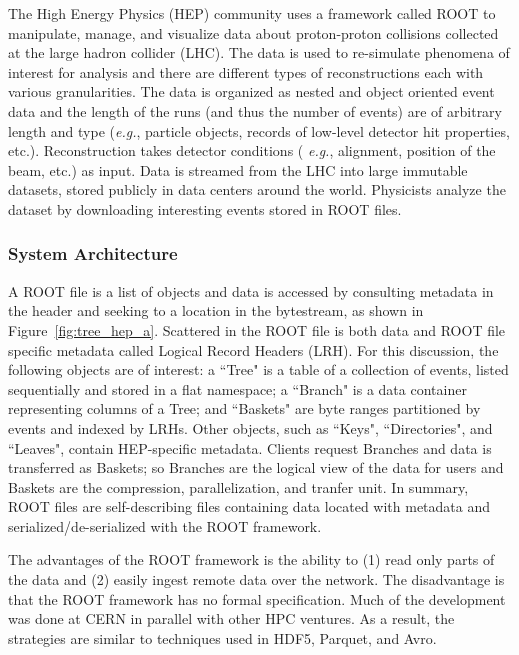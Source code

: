 The High Energy Physics (HEP) community uses a framework called ROOT to
manipulate, manage, and visualize data about proton-proton collisions collected
at the large hadron collider (LHC). The data is used to re-simulate phenomena
of interest for analysis and there are different types of reconstructions each
with various granularities. The data is organized as nested and object oriented
event data and the length of the runs (and thus the number of events) are of
arbitrary length and type ({\it e.g.}, particle objects, records of low-level
detector hit properties, etc.).  Reconstruction takes detector conditions ({\it
e.g.}, alignment, position of the beam, etc.) as input.  Data is streamed from
the LHC into large immutable datasets, stored publicly in data centers around
the world.  Physicists analyze the dataset by downloading interesting events
stored in ROOT files.

\subsubsection{System Architecture}

A ROOT file is a list of objects and data is accessed by consulting metadata in
the header and seeking to a location in the bytestream, as shown in
Figure~\ref{fig:tree_hep_a}. Scattered in the ROOT file is both data and ROOT
file specific metadata called Logical Record Headers (LRH).  For this
discussion, the following objects are of interest: a ``Tree" is a table of a
collection of events, listed sequentially and stored in a flat namespace; a
``Branch" is a data container representing columns of a Tree; and ``Baskets"
are byte ranges partitioned by events and indexed by LRHs.  Other objects, such
as ``Keys", ``Directories", and ``Leaves", contain HEP-specific metadata.
Clients request Branches and data is transferred as Baskets; so Branches are
the logical view of the data for users and Baskets are the compression,
parallelization, and tranfer unit. In summary, ROOT files are self-describing
files containing data located with metadata and serialized/de-serialized with
the ROOT framework.

The advantages of the ROOT framework is the ability to (1) read only parts of
the data and (2) easily ingest remote data over the network. The disadvantage
is that the ROOT framework has no formal specification. Much of the development
was done at CERN in parallel with other HPC ventures. As a result, the
strategies are similar to techniques used in HDF5, Parquet, and Avro.

